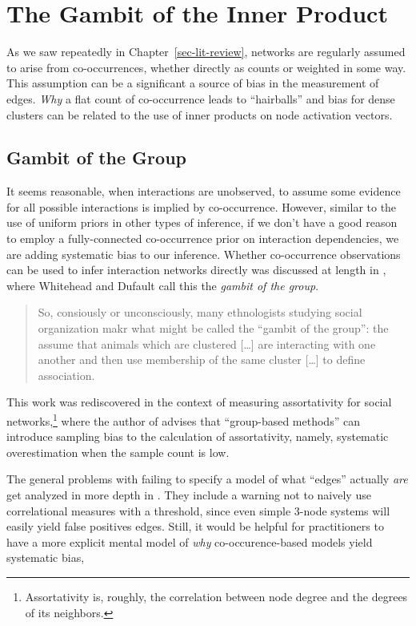 \documentclass[%
	12pt,
		oneside,
		letterpaper
]{book}
\begin{document}
\section{The Gambit of the Inner
Product}\label{the-gambit-of-the-inner-product}

As we saw repeatedly in Chapter~\ref{sec-lit-review}, networks are
regularly assumed to arise from co-occurrences, whether directly as
counts or weighted in some way. This assumption can be a significant a
source of bias in the measurement of edges. \emph{Why} a flat count of
co-occurrence leads to ``hairballs'' and bias for dense clusters can be
related to the use of inner products on node activation vectors.

\subsection{Gambit of the Group}\label{gambit-of-the-group}

It seems reasonable, when interactions are unobserved, to assume some
evidence for all possible interactions is implied by co-occurrence.
However, similar to the use of uniform priors in other types of
inference, if we don't have a good reason to employ a fully-connected
co-occurrence prior on interaction dependencies, we are adding
systematic bias to our inference. Whether co-occurrence observations can
be used to infer interaction networks directly was discussed at length
in \textcite{Techniquesanalyzingvertebrate_Whitehead1999}, where
Whitehead and Dufault call this the \emph{gambit of the group}.

\begin{quote}
So, consiously or unconsciously, many ethnologists studying social
organization makr what might be called the ``gambit of the group'': the
assume that animals which are clustered {[}\ldots{]} are interacting
with one another and then use membership of the same cluster
{[}\ldots{]} to define association.
\end{quote}

This work was rediscovered in the context of measuring assortativity for
social networks,\footnote{Assortativity is, roughly, the correlation
  between node degree and the degrees of its neighbors.} where the
author of \textcite{PerceivedAssortativitySocial_Fisher2017} advises
that ``group-based methods'' can introduce sampling bias to the
calculation of assortativity, namely, systematic overestimation when the
sample count is low.

The general problems with failing to specify a model of what ``edges''
actually \emph{are} get analyzed in more depth in
\textcite{Statisticalinferencelinks_Peel2022}. They include a warning
not to naively use correlational measures with a threshold, since even
simple 3-node systems will easily yield false positives edges. Still, it
would be helpful for practitioners to have a more explicit mental model
of \emph{why} co-occurence-based models yield systematic bias,
\end{document}
